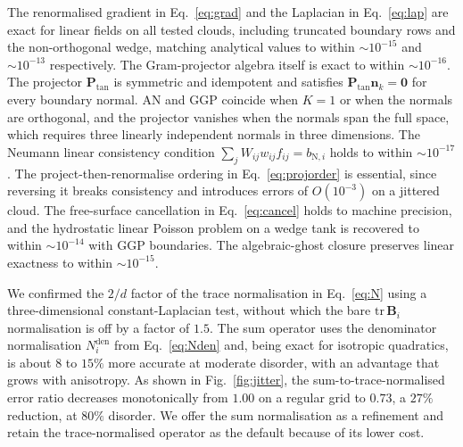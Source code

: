 \documentclass[preprint,review,12pt]{elsarticle}
\newcommand{\Bi}{\mathbf{B}_i}
\newcommand{\Ptan}{\mathbf{P}_{\mathrm{tan}}}
\begin{document}
The renormalised gradient in Eq.~\eqref{eq:grad} and the Laplacian in Eq.~\eqref{eq:lap} are exact for linear fields on all tested clouds, including truncated boundary rows and the non-orthogonal wedge, matching analytical values to within $\sim10^{-15}$ and $\sim10^{-13}$ respectively.
The Gram-projector algebra itself is exact to within $\sim10^{-16}$.
The projector $\Ptan$ is symmetric and idempotent and satisfies $\Ptan\mathbf n_k=\mathbf 0$ for every boundary normal.
AN and GGP coincide when $K=1$ or when the normals are orthogonal, and the projector vanishes when the normals span the full space, which requires three linearly independent normals in three dimensions.
The Neumann linear consistency condition $\sum_j W_{ij}w_{ij}f_{ij}=b_{\mathrm{N},i}$ holds to within $\sim10^{-17}$.
The project-then-renormalise ordering in Eq.~\eqref{eq:projorder} is essential, since reversing it breaks consistency and introduces errors of $O(10^{-3})$ on a jittered cloud.
The free-surface cancellation in Eq.~\eqref{eq:cancel} holds to machine precision, and the hydrostatic linear Poisson problem on a wedge tank is recovered to within $\sim10^{-14}$ with GGP boundaries.
The algebraic-ghost closure preserves linear exactness to within $\sim10^{-15}$.

We confirmed the $2/d$ factor of the trace normalisation in Eq.~\eqref{eq:N} using a three-dimensional constant-Laplacian test, without which the bare $\mathrm{tr}\,\Bi$ normalisation is off by a factor of $1.5$.
The sum operator uses the denominator normalisation $N_i^{\mathrm{den}}$ from Eq.~\eqref{eq:Nden} and, being exact for isotropic quadratics, is about $8$ to $15\%$ more accurate at moderate disorder, with an advantage that grows with anisotropy.
As shown in Fig.~\ref{fig:jitter}, the sum-to-trace-normalised error ratio decreases monotonically from $1.00$ on a regular grid to $0.73$, a $27\%$ reduction, at $80\%$ disorder.
We offer the sum normalisation as a refinement and retain the trace-normalised operator as the default because of its lower cost.
\end{document}
